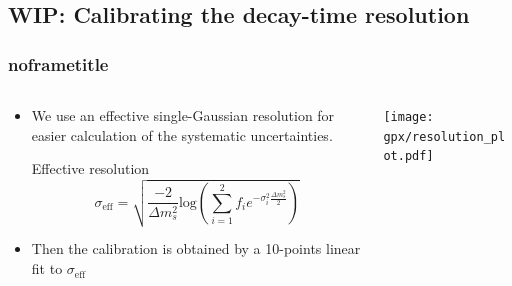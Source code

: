 \documentclass[aspectratio=169,9pt,handout]{beamer}
\newcommand{\pdfnote}[1]{}
\begin{document}
\subsection{{\color{red}WIP:} Calibrating the decay-time resolution}
\begin{frame}[default] %
\frametitle{noframetitle}

\begin{columns}%
  \begin{column}{0.475\textwidth}
      \begin{itemize}
        \item We use an effective single-Gaussian resolution for easier calculation of the systematic uncertainties.
        \begin{block}{Effective resolution}
          {\small $$ \sigma_{\text{eff}} = \sqrt{ \frac{-2}{\Delta m_s^2} \text{log} \left(\sum_{i=1}^2 f_i e^{-\sigma_i^2 \frac{\Delta m_s^2}{2}} \right) }$$ }
        \end{block}
        
        \item Then the calibration is obtained by a 10-points linear fit to $\sigma_{\text{eff}}$
      \end{itemize}
  \end{column}
  \begin{column}{0.475\textwidth}
    \texttt{[image: gpx/resolution\_plot.pdf]}
 \end{column}
\end{columns}

\pdfnote{After we extract the resolution we need to calibrate it. When introducing resolution in the final pdf we use an effective single gaussian, since it is easier to implement and also is easier for the calculation of systematic uncertainties.}
\pdfnote{The calibration is finally obtained from a 10 points linear fit to the effective resolution as we can see at the right hand side ot htis slide}

\end{frame} %
\end{document}
